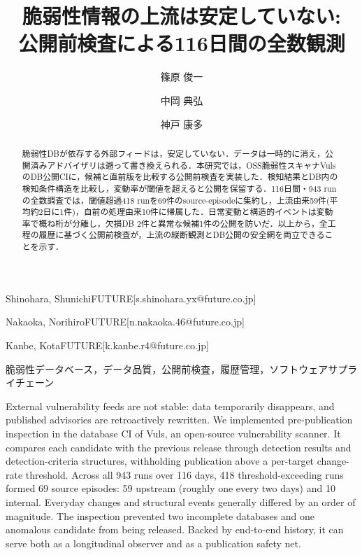 \documentclass{css}
\begin{document}

\title{脆弱性情報の上流は安定していない: \\ 公開前検査による116日間の全数観測}


\author{篠原 俊一}{Shinohara, Shunichi}{FUTURE}[s.shinohara.yx@future.co.jp]
\author{中岡 典弘}{Nakaoka, Norihiro}{FUTURE}[n.nakaoka.46@future.co.jp]
\author{神戸 康多}{Kanbe, Kota}{FUTURE}[k.kanbe.r4@future.co.jp]

\begin{abstract}
脆弱性DBが依存する外部フィードは，安定していない．データは一時的に消え，公開済みアドバイザリは遡って書き換えられる．本研究では，OSS脆弱性スキャナVulsのDB公開CIに，候補と直前版を比較する公開前検査を実装した．検知結果とDB内の検知条件構造を比較し，変動率が閾値を超えると公開を保留する．116日間・943 runの全数調査では，閾値超過418 runを69件のsource-episodeに集約し，上流由来59件(平均約2日に1件)，自前の処理由来10件に帰属した．日常変動と構造的イベントは変動率で概ね桁が分離し，欠損DB 2件と異常な候補1件の公開を防いだ．以上から，全工程の履歴に基づく公開前検査が，上流の縦断観測とDB公開の安全網を両立できることを示す．
\end{abstract}

\begin{jkeyword}
脆弱性データベース，データ品質，公開前検査，履歴管理，ソフトウェアサプライチェーン
\end{jkeyword}

\begin{eabstract}
External vulnerability feeds are not stable: data temporarily disappears, and published advisories are retroactively rewritten. We implemented pre-publication inspection in the database CI of Vuls, an open-source vulnerability scanner. It compares each candidate with the previous release through detection results and detection-criteria structures, withholding publication above a per-target change-rate threshold. Across all 943 runs over 116 days, 418 threshold-exceeding runs formed 69 source episodes: 59 upstream (roughly one every two days) and 10 internal. Everyday changes and structural events generally differed by an order of magnitude. The inspection prevented two incomplete databases and one anomalous candidate from being released. Backed by end-to-end history, it can serve both as a longitudinal observer and as a publication safety net.
\end{eabstract}
\end{document}
